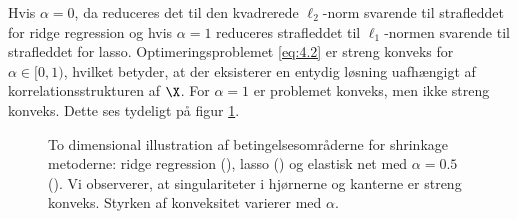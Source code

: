 Hvis $\alpha=0$, da reduceres det til den kvadrerede $\ell_2$-norm svarende til strafleddet for ridge regression og hvis $\alpha=1$ reduceres strafleddet til $\ell_1$-normen svarende til strafleddet for lasso.
Optimeringsproblemet  \eqref{eq:4.2} er streng konveks for \(\alpha \in [0,1)\), hvilket betyder, at der eksisterer en entydig løsning uafhængigt af korrelationsstrukturen af $\X$.
For  \(\alpha=1\) er problemet konveks, men ikke streng konveks.
Dette ses tydeligt på figur \ref{fig:elastisk}.
%
\begin{figure}[H]
\centering
\scalebox{0.8}{}
\caption[optional short text]{To dimensional illustration af betingelsesområderne for shrinkage metoderne: ridge regression (), lasso () og elastisk net med \(\alpha = 0.5\) (). Vi observerer, at singulariteter i hjørnerne og kanterne er streng konveks. Styrken af konveksitet varierer med \(\alpha\).} \label{fig:elastisk}
\end{figure}
%
%
%
